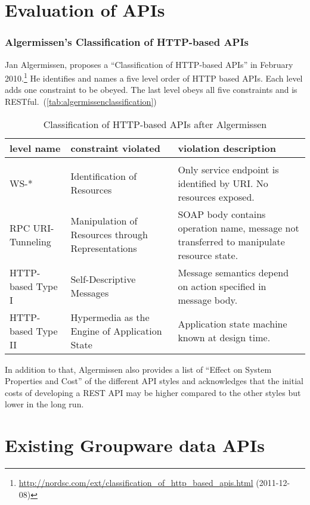 \documentclass[12pt,a4paper]{scrartcl}		%
\newcommand{\citeurl}[2]{\url{#1} (#2)}
\begin{document}
\section{Evaluation of APIs}

\subsubsection{Algermissen's Classification of HTTP-based APIs}
\label{sec:algerm-class-http}

Jan Algermissen, proposes a ``Classification of HTTP-based APIs'' in February 2010.\footnote{
\citeurl{http://nordsc.com/ext/classification_of_http_based_apis.html}{2011-12-08}} 
He identifies and names a five level order of HTTP based APIs. Each level adds
one constraint to be obeyed. The last level obeys all five constraints and is
RESTful.~(\autoref{tab:algermissenclassification})

\begin{table}[h]
  \begin{tabular}{p{} p{} p{}}
    level name & constraint violated & violation description \\
    \hline \\
    WS-* &   Identification of Resources & Only service endpoint is identified by URI. No resources exposed. \\
    RPC URI-Tunneling &    Manipulation of Resources through Representations & SOAP body contains operation name, message not transferred to manipulate resource state. \\
    HTTP-based Type I &    Self-Descriptive Messages & Message semantics depend on action specified in message body. \\
    HTTP-based Type II &    Hypermedia as the Engine of Application State & Application state machine known at design time. \\
  \end{tabular}
  \caption{Classification of HTTP-based APIs after Algermissen}
  \label{tab:algermissenclassification}
\end{table}

In addition to that, Algermissen also provides a list of ``Effect on System
Properties and Cost'' of the different API styles and acknowledges that the
initial costs of developing a REST API may be higher compared to the other
styles but lower in the long run.



\section{Existing Groupware data APIs}
\end{document}
